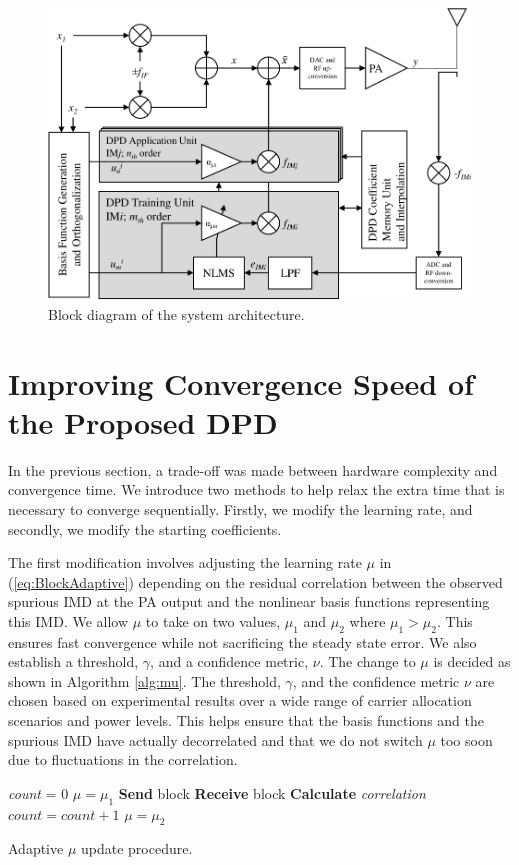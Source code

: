 \begin{figure}[]
	\centering
	\includegraphics[]{blockdiagram}
	\caption{Block diagram of the system architecture. }
	\label{fig:blockdiagram}
\end{figure}
\section{Improving Convergence Speed of the Proposed DPD}
\label{sec:ConvergenceSpeed}
In the previous section, a trade-off was made between hardware complexity and convergence time. We introduce two methods to help relax the extra time that is necessary to converge sequentially. 
Firstly, we modify the learning rate, and secondly, we modify the starting coefficients.

The first modification involves adjusting the learning rate $\mu$ in (\ref{eq:BlockAdaptive}) depending on the residual correlation between the observed spurious IMD at the PA output and the nonlinear basis functions representing this IMD.
We allow $\mu$ to take on two values, $\mu_1$ and $\mu_2$ where $\mu_1 > \mu_2$. 
This ensures fast convergence while not sacrificing the steady state error. 
We also establish a threshold, $\gamma$, and a confidence metric, $\nu$. 
The change to $\mu$ is decided as shown in Algorithm \ref{alg:mu}.
The threshold, $\gamma$, and the confidence metric $\nu$ are chosen based on experimental results over a wide range of carrier allocation scenarios and power levels. 
This helps ensure that the basis functions and the spurious IMD have actually decorrelated and that we do not switch $\mu$ too soon due to fluctuations in the correlation.
\begin{algorithm}[h]
	\SetAlgoLined
	\textit{count} = 0\;
	$\mu = \mu_1$\;
	{
		\textbf{Send} block\;
		\textbf{Receive} block\;
		\textbf{Calculate} \textit{correlation}\;
		{
			$count = count + 1$\; 
		}
		{
			$\mu = \mu_2$\; 
		}
	}
	\caption{Adaptive $\mu$ update procedure.}
	\label{alg:mu}
\end{algorithm}


